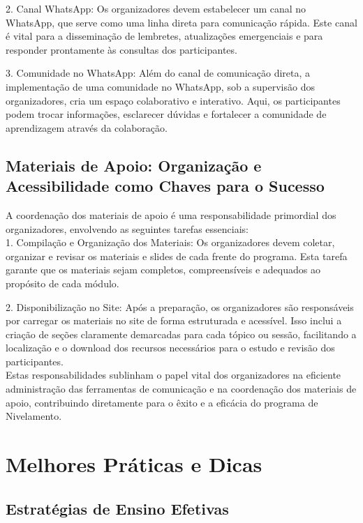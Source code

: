 2. Canal WhatsApp: Os organizadores devem estabelecer um canal no WhatsApp, que serve como uma linha direta para comunicação rápida. Este canal é vital para a disseminação de lembretes, atualizações emergenciais e para responder prontamente às consultas dos participantes.

3. Comunidade no WhatsApp: Além do canal de comunicação direta, a implementação de uma comunidade no WhatsApp, sob a supervisão dos organizadores, cria um espaço colaborativo e interativo. Aqui, os participantes podem trocar informações, esclarecer dúvidas e fortalecer a comunidade de aprendizagem através da colaboração.

\subsection{Materiais de Apoio: Organização e Acessibilidade como Chaves para o Sucesso}

A coordenação dos materiais de apoio é uma responsabilidade primordial dos organizadores, envolvendo as seguintes tarefas essenciais:\\

1. Compilação e Organização dos Materiais: Os organizadores devem coletar, organizar e revisar os materiais e slides de cada frente do programa. Esta tarefa garante que os materiais sejam completos, compreensíveis e adequados ao propósito de cada módulo.

2. Disponibilização no Site: Após a preparação, os organizadores são responsáveis por carregar os materiais no site de forma estruturada e acessível. Isso inclui a criação de seções claramente demarcadas para cada tópico ou sessão, facilitando a localização e o download dos recursos necessários para o estudo e revisão dos participantes.\\

Estas responsabilidades sublinham o papel vital dos organizadores na eficiente administração das ferramentas de comunicação e na coordenação dos materiais de apoio, contribuindo diretamente para o êxito e a eficácia do programa de Nivelamento.

\section{Melhores Práticas e Dicas}

\subsection{Estratégias de Ensino Efetivas}

